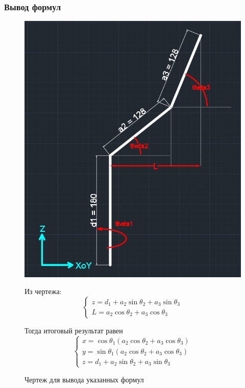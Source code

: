 \documentclass{article}
\begin{document}
\subsubsection*{Вывод формул}
\begin{figure}[h!]
\begin{minipage}{.65\textwidth}
\centering
\includegraphics[width=200 pt]{str_formulas.png}
\caption{Чертеж для вывода указанных формул}
\end{minipage}
\begin{minipage}{.35\textwidth}
\centering
Из чертежа: 
\begin{equation*}
    \begin{cases}
        z = d_1 + a_2\sin{\theta_2} + a_3\sin{\theta_3} \\
        L = a_2\cos{\theta_2} + a_3\cos{\theta_3}
    \end{cases}
\end{equation*}

Тогда итоговый результат равен\\
\begin{equation*}
    \begin{cases}
        x = \cos{\theta_1}(a_2\cos{\theta_2} + a_3\cos{\theta_3}) \\
        y = \sin{\theta_1}(a_2\cos{\theta_2} + a_3\cos{\theta_3}) \\
        z = d_1 + a_2\sin{\theta_2} + a_3\sin{\theta_3}
    \end{cases}
\end{equation*}

\end{minipage}
\end{figure}
\FloatBarrier
\end{document}
